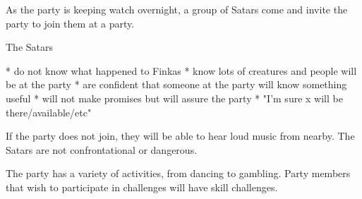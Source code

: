 As the party is keeping watch overnight, a group of Satars come and invite the party to join them at a party.

The Satars

* do not know what happened to Finkas
* know lots of creatures and people will be at the party
* are confident that someone at the party will know something useful
* will not make promises but will assure the party
* "I'm sure x will be there/available/etc"

If the party does not join, they will be able to hear loud music from nearby.
The Satars are not confrontational or dangerous.

The party has a variety of activities, from dancing to gambling.
Party members that wish to participate in challenges will have skill challenges.
